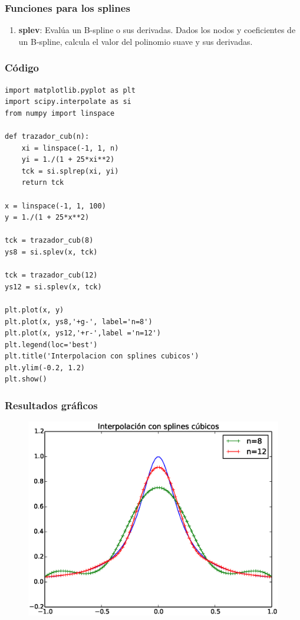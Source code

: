 \documentclass[12pt]{beamer}
\begin{document}
\begin{frame}
\frametitle{Funciones para los splines}
\begin{enumerate}[<+->]
\conti    
\item \textbf{splev}: Evalúa un B-spline o sus derivadas. Dados los nodos y coeficientes de un B-spline, calcula 
el valor del polinomio suave y sus derivadas.
\end{enumerate}
\end{frame}
\begin{frame}
\frametitle{Código}
\begin{lstlisting}
import matplotlib.pyplot as plt
import scipy.interpolate as si
from numpy import linspace

def trazador_cub(n):
    xi = linspace(-1, 1, n)
    yi = 1./(1 + 25*xi**2)
    tck = si.splrep(xi, yi)
    return tck

x = linspace(-1, 1, 100)
y = 1./(1 + 25*x**2)

tck = trazador_cub(8)
ys8 = si.splev(x, tck)

tck = trazador_cub(12)
ys12 = si.splev(x, tck)

plt.plot(x, y)
plt.plot(x, ys8,'+g-', label='n=8')
plt.plot(x, ys12,'+r-',label ='n=12')
plt.legend(loc='best')
plt.title('Interpolacion con splines cubicos')
plt.ylim(-0.2, 1.2)
plt.show()
\end{lstlisting}
\end{frame}
\begin{frame}
\frametitle{Resultados gráficos}
\begin{figure}
	\centering
	\includegraphics[scale=0.47]{Imagenes/Funcion_Runge_04.eps} 
\end{figure}
\end{frame}
\end{document}
